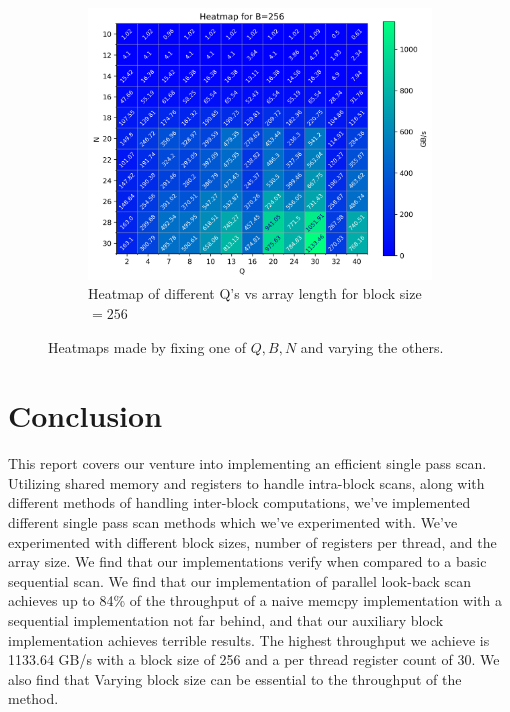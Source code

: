\documentclass[twocolumn]{article}
\begin{document}
\begin{figure}[h]
\begin{subfigure}{0.68\linewidth}
        \includegraphics[width=\linewidth]{report/plots/heatmap_QvN_B=256.png}
        \caption{Heatmap of different Q's vs array length for block size $=256$}
        \label{fig:heatmap-b}
    \end{subfigure}
    \caption{Heatmaps made by fixing one of $Q, B, N$ and varying the others.}
    \label{fig:heatmaps}
\end{figure}

\section{Conclusion}
This report covers our venture into implementing an efficient single pass scan. Utilizing shared memory and registers to handle intra-block scans, along with different methods of handling inter-block computations, we've implemented different single pass scan methods which we've experimented with. We've experimented with different block sizes, number of registers per thread, and the array size. We find that our implementations verify when compared to a basic sequential scan. We find that our implementation of parallel look-back scan achieves up to 84\% of the throughput of a naive memcpy implementation with a sequential implementation not far behind, and that our auxiliary block implementation achieves terrible results. The highest throughput we achieve is 1133.64 GB/s with a block size of 256 and a per thread register count of 30. We also find that Varying block size can be essential to the throughput of the method.

\onecolumn
\end{document}
